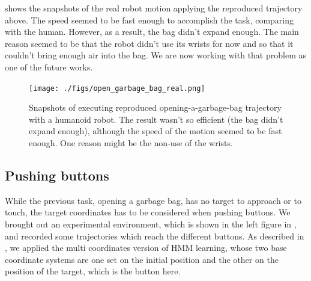  shows the snapshots of the real robot motion applying the reproduced trajectory above. The speed seemed to be fast enough to accomplish the task, comparing with the human. However, as a result, the bag didn't expand enough. The main reason seemed to be that the robot didn't use its wrists for now and so that it couldn't bring enough air into the bag. We are now working with that problem as one of the future works.

\begin{figure}[htbp]
  \begin{center}
    \texttt{[image: ./figs/open\_garbage\_bag\_real.png]}
    \caption{Snapshots of executing reproduced opening-a-garbage-bag trajectory with a humanoid robot. The result wasn't so efficient (the bag didn't expand enough), although the speed of the motion seemed to be fast enough. One reason might be the non-use of the wrists.}
    \label{figure:open_garbage_bag_real}
  \end{center}
\end{figure}

\subsection{Pushing buttons}

While the previous task, opening a garbage bag, has no target to approach or to touch, the target coordinates has to be considered when pushing buttons. We brought out an experimental environment, which is shown in the left figure in , and recorded some trajectories which reach the different buttons. As described in , we applied the multi coordinates version of HMM learning, whose two base coordinate systems are one set on the initial position and the other on the position of the target, which is the button here.

